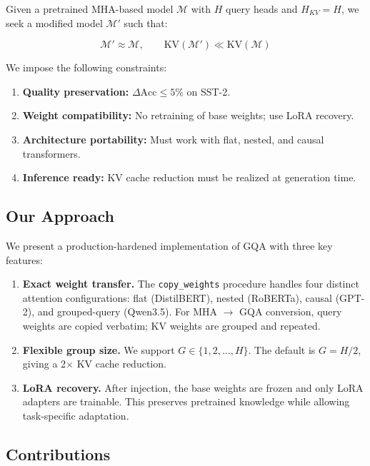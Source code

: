 Given a pretrained MHA-based model $\mathcal{M}$ with $H$ query heads and 
$H_{KV} = H$, we seek a modified model $\mathcal{M}'$ such that:

\[
\mathcal{M}' \approx \mathcal{M}, \qquad
\text{KV}(\mathcal{M}') \ll \text{KV}(\mathcal{M})
\tag{1.3}
\]

We impose the following constraints:

\begin{enumerate}
\item \textbf{Quality preservation:} $\Delta\text{Acc} \leq 5\%$ on SST-2.
\item \textbf{Weight compatibility:} No retraining of base weights; use LoRA recovery.
\item \textbf{Architecture portability:} Must work with flat, nested, and causal transformers.
\item \textbf{Inference ready:} KV cache reduction must be realized at generation time.

\end{enumerate}
\subsection{Our Approach}

We present a production-hardened implementation of GQA with three key features:

\begin{enumerate}
\item \textbf{Exact weight transfer.} The \texttt{copy\_weights} procedure handles four
  distinct attention configurations: flat (DistilBERT), nested (RoBERTa),
  causal (GPT-2), and grouped-query (Qwen3.5). For MHA $\to$ GQA conversion,
  query weights are copied verbatim; KV weights are grouped and repeated.

\item \textbf{Flexible group size.} We support $G \in \{1, 2, \ldots, H\}$. The
  default is $G = H / 2$, giving a 2$\times$ KV cache reduction.

\item \textbf{LoRA recovery.} After injection, the base weights are frozen and
  only LoRA adapters are trainable. This preserves pretrained knowledge
  while allowing task-specific adaptation.

\end{enumerate}
\subsection{Contributions}

